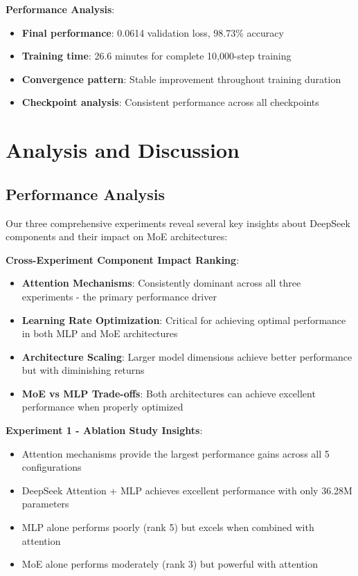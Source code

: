 \documentclass[11pt,a4paper]{article}
\begin{document}
\textbf{Performance Analysis}:
\begin{itemize}
    \item \textbf{Final performance}: 0.0614 validation loss, 98.73\% accuracy
    \item \textbf{Training time}: 26.6 minutes for complete 10,000-step training
    \item \textbf{Convergence pattern}: Stable improvement throughout training duration
    \item \textbf{Checkpoint analysis}: Consistent performance across all checkpoints
\end{itemize}


\section{Analysis and Discussion}

\subsection{Performance Analysis}

Our three comprehensive experiments reveal several key insights about DeepSeek components and their impact on MoE architectures:

\textbf{Cross-Experiment Component Impact Ranking}:
\begin{itemize}
    \item \textbf{Attention Mechanisms}: Consistently dominant across all three experiments - the primary performance driver
    \item \textbf{Learning Rate Optimization}: Critical for achieving optimal performance in both MLP and MoE architectures
    \item \textbf{Architecture Scaling}: Larger model dimensions achieve better performance but with diminishing returns
    \item \textbf{MoE vs MLP Trade-offs}: Both architectures can achieve excellent performance when properly optimized
\end{itemize}

\textbf{Experiment 1 - Ablation Study Insights}:
\begin{itemize}
    \item Attention mechanisms provide the largest performance gains across all 5 configurations
    \item DeepSeek Attention + MLP achieves excellent performance with only 36.28M parameters
    \item MLP alone performs poorly (rank 5) but excels when combined with attention
    \item MoE alone performs moderately (rank 3) but powerful with attention
\end{itemize}
\end{document}
